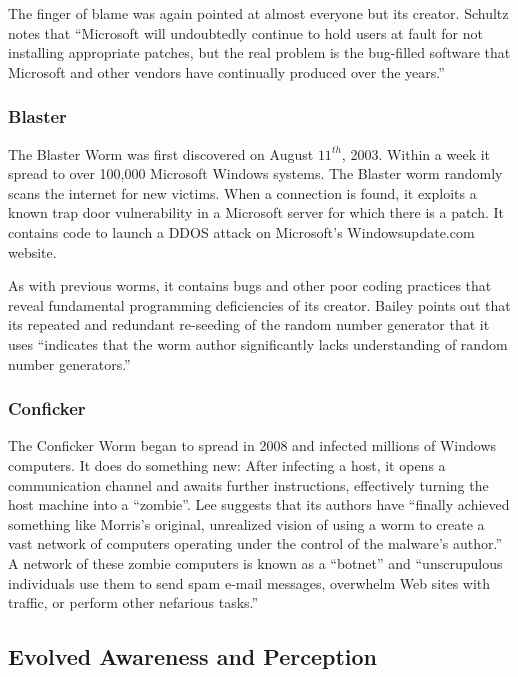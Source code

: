 The finger of blame was again pointed at almost everyone but
its creator. Schultz\cite{schultz_security_2003} notes that ``Microsoft will
undoubtedly continue to hold users at fault for not installing
appropriate patches, but the real problem is the
bug-filled software that Microsoft and other
vendors have continually produced over the
years.'' 

\subsubsection*{Blaster}
The Blaster Worm was first discovered on August $11^{th}$, 2003. Within a week
it spread to over 100,000 Microsoft Windows systems. The Blaster worm randomly
scans the internet for new victims. When a connection is found, it exploits a
known trap door vulnerability in a Microsoft server for which there is a
patch. It contains code to launch a DDOS attack on Microsoft's Windowsupdate.com
website\cite{bailey_blaster_2005}. 

As with previous worms, it contains bugs and other poor coding practices that
reveal fundamental programming deficiencies of its creator. 
Bailey\cite{bailey_blaster_2005} points out that its repeated and redundant
re-seeding of the random number generator that it uses ``indicates that the worm author
significantly lacks understanding of random number generators.''

\subsubsection*{Conficker}
The Conficker Worm began to spread in 2008 and infected millions of Windows
computers. It does do something new: After
infecting a host, it opens a communication channel and awaits further
instructions, effectively turning the host machine into a ``zombie''. 
Lee\cite{lee_washpost_2013} suggests that its authors have ``finally achieved
something like Morris's original, unrealized vision of using a worm to create a
vast network of computers operating under the control of the malware's author.''
A network of these zombie computers is known as a ``botnet'' and ``unscrupulous
individuals use them to send spam e-mail messages, overwhelm Web sites with
traffic, or perform other nefarious tasks.''\cite{lee_washpost_2013}
		
\subsection*{Evolved Awareness and Perception}

